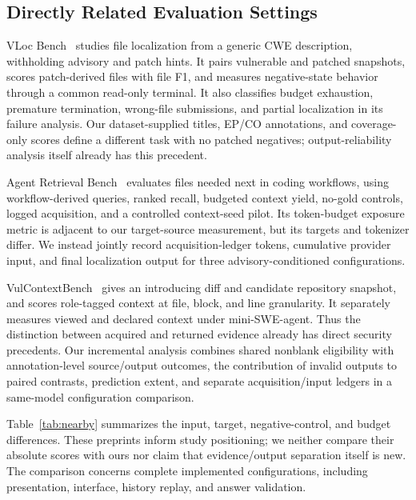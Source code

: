 \subsection{Directly Related Evaluation Settings}
VLoc Bench~\cite{vloc} studies file localization from a generic CWE description, withholding advisory and patch hints. It pairs vulnerable and patched snapshots, scores patch-derived files with file F1, and measures negative-state behavior through a common read-only terminal. It also classifies budget exhaustion, premature termination, wrong-file submissions, and partial localization in its failure analysis. Our dataset-supplied titles, EP/CO annotations, and coverage-only scores define a different task with no patched negatives; output-reliability analysis itself already has this precedent.

Agent Retrieval Bench~\cite{agentretrieval} evaluates files needed next in coding workflows, using workflow-derived queries, ranked recall, budgeted context yield, no-gold controls, logged acquisition, and a controlled context-seed pilot. Its token-budget exposure metric is adjacent to our target-source measurement, but its targets and tokenizer differ. We instead jointly record acquisition-ledger tokens, cumulative provider input, and final localization output for three advisory-conditioned configurations.

VulContextBench~\cite{vulcontext} gives an introducing diff and candidate repository snapshot, and scores role-tagged context at file, block, and line granularity. It separately measures viewed and declared context under mini-SWE-agent. Thus the distinction between acquired and returned evidence already has direct security precedents. Our incremental analysis combines shared nonblank eligibility with annotation-level source/output outcomes, the contribution of invalid outputs to paired contrasts, prediction extent, and separate acquisition/input ledgers in a same-model configuration comparison.


Table~\ref{tab:nearby} summarizes the input, target, negative-control, and budget differences. These preprints inform study positioning; we neither compare their absolute scores with ours nor claim that evidence/output separation itself is new. The comparison concerns complete implemented configurations, including presentation, interface, history replay, and answer validation.

